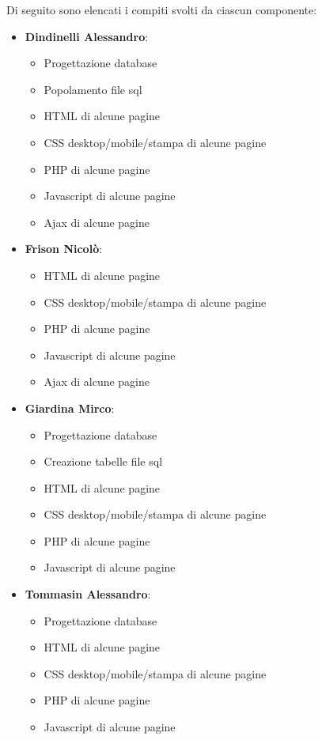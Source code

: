 \documentclass{article}
\begin{document}
		\vspace{0.5cm}
		Di seguito sono elencati i compiti svolti da ciascun componente:
		\begin{itemize}
			\item{\bfseries Dindinelli Alessandro}:
				\begin{itemize}
					\item Progettazione database
					\item Popolamento file sql
					\item HTML di alcune pagine
					\item CSS desktop/mobile/stampa di alcune pagine
					\item PHP di alcune pagine
					\item Javascript di alcune pagine
					\item Ajax di alcune pagine
				\end{itemize}
			\item{\bfseries Frison Nicolò}:
				\begin{itemize}
					\item HTML di alcune pagine
					\item CSS desktop/mobile/stampa di alcune pagine
					\item PHP di alcune pagine
					\item Javascript di alcune pagine
					\item Ajax di alcune pagine
				\end{itemize}
			\item{\bfseries Giardina Mirco}:
				\begin{itemize}
					\item Progettazione database
					\item Creazione tabelle file sql
					\item HTML di alcune pagine
					\item CSS desktop/mobile/stampa di alcune pagine
					\item PHP di alcune pagine
					\item Javascript di alcune pagine
				\end{itemize}
			\item{\bfseries Tommasin Alessandro}:
				\begin{itemize}
					\item Progettazione database
					\item HTML di alcune pagine
					\item CSS desktop/mobile/stampa di alcune pagine
					\item PHP di alcune pagine
					\item Javascript di alcune pagine
				\end{itemize}
		\end{itemize}
\end{document}
